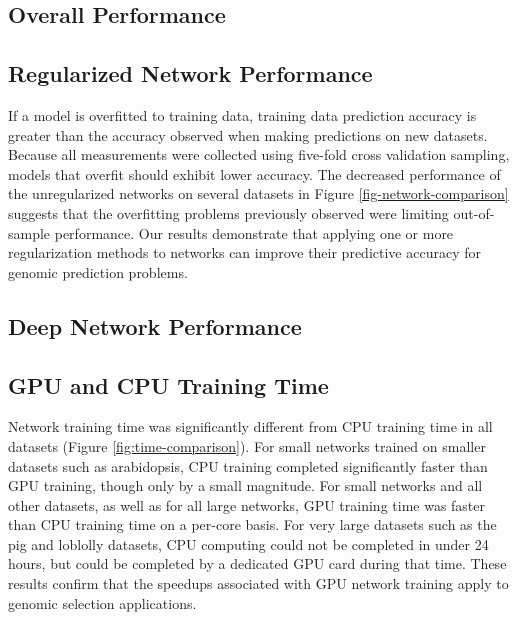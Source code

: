 
\subsection*{Overall Performance}

\ifdefined\showtablesandfigures
\fi

\subsection*{Regularized Network Performance}

If a model is overfitted to training data, training data prediction accuracy is greater than 
the accuracy observed when making predictions on new datasets. Because all measurements were collected 
using five-fold cross validation sampling, models that overfit should exhibit lower accuracy. 
The decreased performance of the unregularized networks on several datasets in Figure 
\ref{fig-network-comparison} suggests that the overfitting problems 
previously observed were limiting out-of-sample performance. Our results demonstrate that 
applying one or more regularization methods to networks can improve their 
predictive accuracy for genomic prediction problems.

\ifdefined\showtablesandfigures
\fi

\subsection*{Deep Network Performance}

\ifdefined\showtablesandfigures
\fi

\subsection*{GPU and CPU Training Time}

Network training time was significantly different from CPU training time in all datasets (Figure \ref{fig:time-comparison}).
For small networks trained on smaller datasets such as arabidopsis, CPU training completed significantly faster than GPU training, though only
by a small magnitude. For small networks and all other datasets, as well as for all large networks, GPU training time was faster than 
CPU training time on a per-core basis. For very large datasets such as the pig and loblolly datasets, CPU computing could not be 
completed in under 24 hours, but could be completed by a dedicated GPU card during that time. These results confirm that the 
speedups associated with GPU network training apply to genomic selection applications.  

